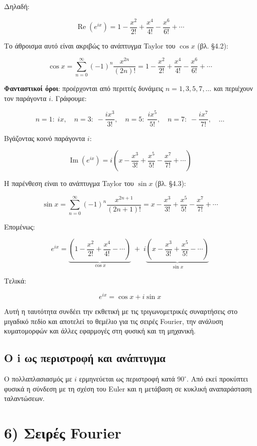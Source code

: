 \documentclass[
  a4paper,
  11pt,
]{article}
\begin{document}
Δηλαδή:

\[
\operatorname{Re}(e^{ix}) = 1 - \frac{x^2}{2!} + \frac{x^4}{4!} - \frac{x^6}{6!} + \cdots
\]

Το άθροισμα αυτό είναι ακριβώς το ανάπτυγμα Taylor του \(\cos x\) (βλ.
§4.2):

\[
\cos x = \sum_{n=0}^{\infty} (-1)^n \frac{x^{2n}}{(2n)!} = 1 - \frac{x^2}{2!} + \frac{x^4}{4!} - \frac{x^6}{6!} + \cdots
\]

\textbf{Φανταστικοί όροι}: προέρχονται από περιττές δυνάμεις
\(n = 1,3,5,7,\dots\) και περιέχουν τον παράγοντα \(i\). Γράφουμε:

\[
n=1:\; i x,\quad n=3:\; -\frac{i x^3}{3!},\quad n=5:\; \frac{i x^5}{5!},\quad n=7:\; -\frac{i x^7}{7!},\quad \dots
\]

Βγάζοντας κοινό παράγοντα \(i\):

\[
\operatorname{Im}(e^{ix}) = i\left( x - \frac{x^3}{3!} + \frac{x^5}{5!} - \frac{x^7}{7!} + \cdots \right)
\]

Η παρένθεση είναι το ανάπτυγμα Taylor του \(\sin x\) (βλ. §4.3):

\[
\sin x = \sum_{n=0}^{\infty} (-1)^n \frac{x^{2n+1}}{(2n+1)!} = x - \frac{x^3}{3!} + \frac{x^5}{5!} - \frac{x^7}{7!} + \cdots
\]

Επομένως:

\[
e^{ix} = \underbrace{\left(1 - \frac{x^2}{2!} + \frac{x^4}{4!} - \cdots \right)}_{\cos x} \;+\; i\underbrace{\left(x - \frac{x^3}{3!} + \frac{x^5}{5!} - \cdots \right)}_{\sin x}
\]

Τελικά:

\[
\boxed{e^{ix} = \cos x + i\sin x}
\]

Αυτή η ταυτότητα συνδέει την εκθετική με τις τριγωνομετρικές συναρτήσεις
στο μιγαδικό πεδίο και αποτελεί το θεμέλιο για τις σειρές Fourier, την
ανάλυση κυματομορφών και άλλες εφαρμογές στη φυσική και τη μηχανική.

\subsection{Ο i ως περιστροφή και
ανάπτυγμα}\label{ux3bf-i-ux3c9ux3c2-ux3c0ux3b5ux3c1ux3b9ux3c3ux3c4ux3c1ux3bfux3c6ux3ae-ux3baux3b1ux3b9-ux3b1ux3bdux3acux3c0ux3c4ux3c5ux3b3ux3bcux3b1}

Ο πολλαπλασιασμός με \(i\) ερμηνεύεται ως περιστροφή κατά \(90^\circ\).
Από εκεί προκύπτει φυσικά η σύνδεση με τη σχέση του Euler και η μετάβαση
σε κυκλική αναπαράσταση ταλαντώσεων.

\section{6) Σειρές
Fourier}\label{ux3c3ux3b5ux3b9ux3c1ux3adux3c2-fourier}
\end{document}
